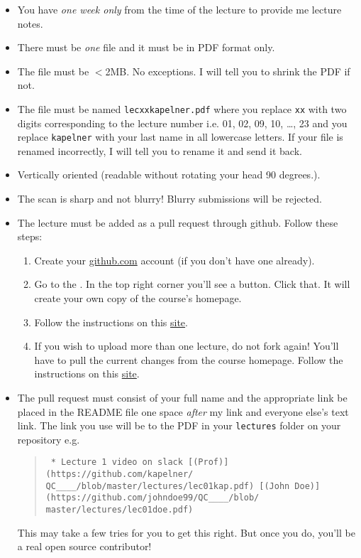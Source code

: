 \begin{itemize}
\item You have \emph{one week only} from the time of the lecture to provide me lecture notes.
\item There must be \emph{one} file and it must be in PDF format only. 
\item The file must be $<$2MB. No exceptions. I will tell you to shrink the PDF if not.
\item The file must be named \texttt{lecxxkapelner.pdf} where you replace \texttt{xx} with two digits corresponding to the lecture number i.e. 01, 02, 09, 10, \ldots, 23 and you replace \texttt{kapelner} with your last name in all lowercase letters. If your file is renamed incorrectly, I will tell you to rename it and send it back.
\item Vertically oriented (readable without rotating your head 90 degrees.).
\item The scan is sharp and not blurry! Blurry submissions will be rejected.
\item The lecture must be added as a pull request through github. Follow these steps:

\begin{enumerate}[1.]
\item Create your \url{github.com} account (if you don't have one already).
\item Go to the \coursewebpagelink. In the top right corner you'll see a  button. Click that. It will create your own copy of the course's homepage.
\item Follow the instructions on this \href{https://opensource.com/article/19/7/create-pull-request-github}{site}.
\item If you wish to upload more than one lecture, do not fork again! You'll have to pull the current changes from the course homepage. Follow the instructions on this \href{https://docs.github.com/en/free-pro-team@latest/github/collaborating-with-issues-and-pull-requests/syncing-a-fork}{site}. 
\end{enumerate}
\item The pull request must consist of your full name and the appropriate link be placed in the README file one space \emph{after} my link and everyone else's text link. The link you use will be to the PDF in your \texttt{lectures} folder on your repository e.g.

\begin{quotation}
\noindent\texttt{
* Lecture 1 video on slack [(Prof)](https://github.com/kapelner/
QC\_\coursedept\_\coursenumber\_\semester\_\the\year/blob/master/lectures/lec01kap.pdf) [(John Doe)](https://github.com/johndoe99/QC\_\coursedept\_\coursenumber\_\semester\_\the\year/blob/
master/lectures/lec01doe.pdf)}
\end{quotation}

This may take a few tries for you to get this right. But once you do, you'll be a real open source contributor!
\end{itemize}

